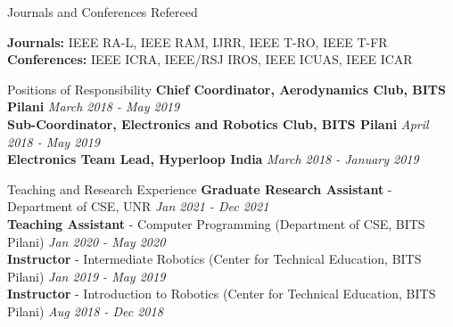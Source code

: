 \documentclass{resume} %
\begin{document}

\begin{rSection}{Journals and Conferences Refereed}

{\bf Journals:} IEEE RA-L, IEEE RAM, IJRR, IEEE T-RO, IEEE T-FR \\
{\bf Conferences:} IEEE ICRA, IEEE/RSJ IROS, IEEE ICUAS, IEEE ICAR
\end{rSection}










\begin{rSection}{Positions of Responsibility}
\small{{{\bf Chief Coordinator, Aerodynamics Club, BITS Pilani} \hfill \small{{\em March 2018 - May 2019}}}}\\
\small{{\bf Sub-Coordinator, Electronics and Robotics Club, BITS Pilani} \hfill \small{{\em April 2018 - May 2019}}}\\
{\bf Electronics Team Lead, Hyperloop India} \hfill \small{{\em March 2018 - January 2019}}


\end{rSection}




\begin{rSection}{Teaching and Research Experience}
\small{\bf Graduate Research Assistant} - Department of CSE, UNR \hfill \small{{\em Jan 2021 - Dec 2021}} \\
\small{\bf Teaching Assistant} - Computer Programming (Department of CSE, BITS Pilani) \hfill \small{{\em Jan 2020 - May 2020}} \\
\small{\bf Instructor} - Intermediate Robotics (Center for Technical Education, BITS Pilani) \hfill \small{{\em Jan 2019 - May 2019}} \\
{\bf Instructor} - Introduction to Robotics (Center for Technical Education, BITS Pilani) \hfill \small{{\em Aug 2018 - Dec 2018}}\\
\end{rSection}

\end{document}
